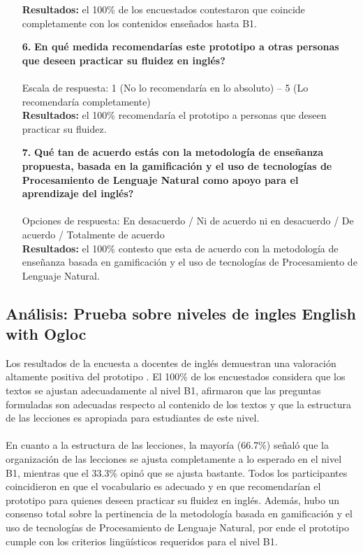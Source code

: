 \begin{enumerate}
\textbf{Resultados: } el 100\% de los encuestados contestaron que coincide completamente con los contenidos enseñados hasta B1.
\\

\item[\textbf{6.}] \textbf{\textquestiondown En qué medida recomendarías este prototipo a otras personas que deseen practicar su fluidez en inglés?} \\\\
Escala de respuesta: 1 (No lo recomendaría en lo absoluto) -- 5 (Lo recomendaría completamente)\\

\textbf{Resultados: } el 100\% recomendaría el prototipo a personas que deseen practicar su fluidez.
\\

\item[\textbf{7.}] \textbf{\textquestiondown Qué tan de acuerdo estás con la metodología de enseñanza propuesta, basada en la gamificación y el uso de tecnologías de Procesamiento de Lenguaje Natural como apoyo para el aprendizaje del inglés?} \\\\
Opciones de respuesta: En desacuerdo / Ni de acuerdo ni en desacuerdo / De acuerdo / Totalmente de acuerdo\\


\textbf{Resultados: } el 100\% contesto que esta de acuerdo con la metodología de enseñanza basada en gamificación y el uso de tecnologías de Procesamiento de Lenguaje Natural. 
\\

\end{enumerate}

\subsection{Análisis: Prueba sobre niveles de ingles English with Ogloc}

Los resultados de la encuesta a docentes de inglés demuestran una valoración altamente positiva del prototipo . El 100\% de los encuestados considera que los textos se ajustan adecuadamente al nivel B1, afirmaron que las preguntas formuladas son adecuadas respecto al contenido de los textos y que la estructura de las lecciones es apropiada para estudiantes de este nivel.
\\
\\
En cuanto a la estructura de las lecciones, la mayoría (66.7\%) señaló que la organización de las lecciones se ajusta completamente a lo esperado en el nivel B1, mientras que el 33.3\% opinó que se ajusta bastante. Todos los participantes coincidieron en que el vocabulario es adecuado y en que recomendarían el prototipo para quienes deseen practicar su fluidez en inglés. Además, hubo un consenso total sobre la pertinencia de la metodología basada en gamificación y el uso de tecnologías de Procesamiento de Lenguaje Natural, por ende  el prototipo cumple con los criterios lingüísticos requeridos para el nivel B1.


